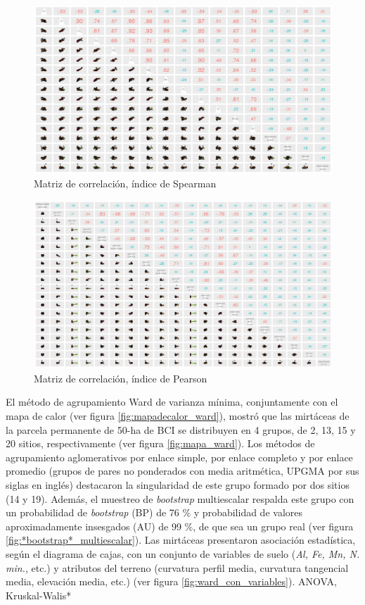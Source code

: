\documentclass[11pt,]{article}
\begin{document}
\begin{figure}
\centering
\includegraphics{matriz_correlacion_suelo_abun_riq_spearman.png}
\caption{Matriz de correlación, índice de Spearman
\label{fig:matriz_spearman}}
\end{figure}

\begin{figure}
\centering
\includegraphics{matriz_correlacion_geomorf_abun_riq_spearman.png}
\caption{Matriz de correlación, índice de Pearson
\label{fig:matriz_pearson}}
\end{figure}

El método de agrupamiento Ward de varianza mínima, conjuntamente con el
mapa de calor (ver figura \ref{fig:mapadecalor_ward}), mostró que las
mirtáceas de la parcela permanente de 50-ha de BCI se distribuyen en 4
grupos, de 2, 13, 15 y 20 sitios, respectivamente (ver figura
\ref{fig:mapa_ward}). Los métodos de agrupamiento aglomerativos por
enlace simple, por enlace completo y por enlace promedio (grupos de
pares no ponderados con media aritmética, UPGMA por sus siglas en
inglés) destacaron la singularidad de este grupo formado por dos sitios
(14 y 19). Además, el muestreo de \emph{bootstrap} multiescalar respalda
este grupo con un probabilidad de \emph{bootstrap} (BP) de 76 \% y
probabilidad de valores aproximadamente insesgados (AU) de 99 \%, de que
sea un grupo real (ver figura \ref {fig:*bootstrap*_multiescalar}). Las
mirtáceas presentaron asociación estadística, según el diagrama de
cajas, con un conjunto de variables de suelo (\emph{Al, Fe, Mn, N.
min.}, etc.) y atributos del terreno (curvatura perfil media, curvatura
tangencial media, elevación media, etc.) (ver figura
\ref{fig:ward_con_variables}). ANOVA, Kruskal-Walis*
\end{document}
